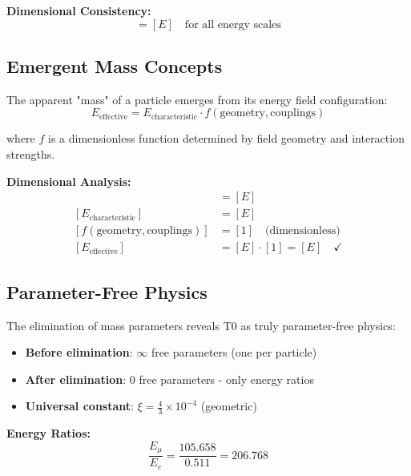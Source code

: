 \documentclass[12pt,a4paper]{report}
\begin{document}
	\textbf{Dimensional Consistency:}
	\begin{equation}
		[E_{\text{scale}}] = [E] \quad \text{for all energy scales}
	\end{equation}
	
	\subsection{Emergent Mass Concepts}\label{subsec:emergent_mass}
	
	The apparent "mass" of a particle emerges from its energy field configuration:
	\begin{equation}
		E_{\text{effective}} = E_{\text{characteristic}} \cdot f(\text{geometry}, \text{couplings})
	\end{equation}
	
	where $f$ is a dimensionless function determined by field geometry and interaction strengths.
	
	\textbf{Dimensional Analysis:}
	\begin{align}
		[E_{\text{effective}}] &= [E] \\
		[E_{\text{characteristic}}] &= [E] \\
		[f(\text{geometry}, \text{couplings})] &= [1] \quad \text{(dimensionless)} \\
		[E_{\text{effective}}] &= [E] \cdot [1] = [E] \quad \checkmark
	\end{align}
	
	\subsection{Parameter-Free Physics}\label{subsec:parameter_free}
	
	The elimination of mass parameters reveals T0 as truly parameter-free physics:
	\begin{itemize}
		\item \textbf{Before elimination}: $\infty$ free parameters (one per particle)
		\item \textbf{After elimination}: 0 free parameters - only energy ratios
		\item \textbf{Universal constant}: $\xi = \frac{4}{3} \times 10^{-4}$ (geometric)
	\end{itemize}
	
	\textbf{Energy Ratios:}
	\begin{equation}
		\frac{E_{\mu}}{E_e} = \frac{105.658}{0.511} = 206.768
	\end{equation}
	
\end{document}
